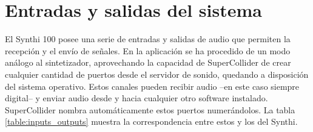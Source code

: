 \section[Entradas y salidas]{Entradas y salidas del sistema }

El Synthi 100 posee una serie de entradas y salidas de audio que permiten la recepción y el envío de señales. En la aplicación se ha procedido de un modo análogo al sintetizador, aprovechando la capacidad de SuperCollider de crear cualquier cantidad de puertos desde el servidor de sonido, quedando a disposición del sistema operativo. Estos canales pueden recibir audio --en este caso siempre digital-- y enviar audio desde y hacia cualquier otro software instalado. SuperCollider nombra automáticamente estos puertos numerándolos. La tabla \ref{table:inputs_outputs} muestra la correspondencia entre estos y los del Synthi. 

